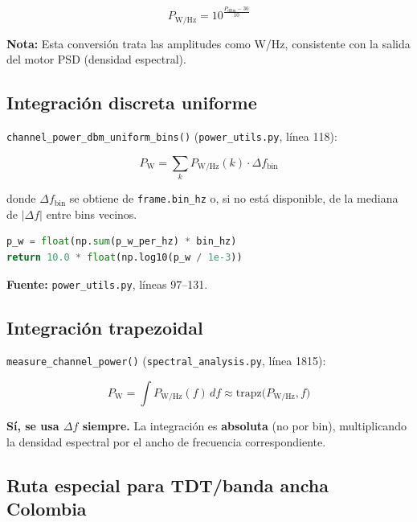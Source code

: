 \documentclass[11pt,a4paper]{article}
\begin{document}
\begin{equation}
P_{\text{W/Hz}} = 10^{\frac{P_{\text{dBm}} - 30}{10}}
\label{eq:dbm_to_w}
\end{equation}

\textbf{Nota:} Esta conversión trata las amplitudes como W/Hz, consistente con la salida del motor PSD (densidad espectral).

\subsection{Integración discreta uniforme}

\texttt{channel\_power\_dbm\_uniform\_bins()} (\texttt{power\_utils.py}, línea 118):

\begin{equation}
P_{\text{W}} = \sum_{k} P_{\text{W/Hz}}(k) \cdot \Delta f_{\text{bin}}
\label{eq:discrete}
\end{equation}

donde $\Delta f_{\text{bin}}$ se obtiene de \texttt{frame.bin\_hz} o, si no está disponible, de la mediana de $|\Delta f|$ entre bins vecinos.

\begin{lstlisting}[language=Python]
p_w = float(np.sum(p_w_per_hz) * bin_hz)
return 10.0 * float(np.log10(p_w / 1e-3))
\end{lstlisting}

\textbf{Fuente:} \texttt{power\_utils.py}, líneas 97--131.

\subsection{Integración trapezoidal}

\texttt{measure\_channel\_power()} (\texttt{spectral\_analysis.py}, línea 1815):

\begin{equation}
P_{\text{W}} = \int P_{\text{W/Hz}}(f)\, df \approx \text{trapz}\big(P_{\text{W/Hz}}, f\big)
\label{eq:trapz}
\end{equation}

\textbf{Sí, se usa $\Delta f$ siempre.} La integración es \textbf{absoluta} (no por bin), multiplicando la densidad espectral por el ancho de frecuencia correspondiente.

\subsection{Ruta especial para TDT/banda ancha Colombia}
\end{document}
